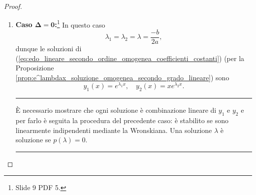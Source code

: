 \begin{proof}
\begin{enumerate}
		\item \textbf{Caso $\boldsymbol{\Delta=0}$:}\footnote{Slide 9 PDF 5.} In questo caso
		\begin{equation*}
			\lambda_1=\lambda_2=\lambda=\frac{-b}{2a},
		\end{equation*}
		dunque le soluzioni di (\ref{eq:edo_lineare_secondo_ordine_omogenea_coefficienti_costanti}) (per la Proposizione \ref{prop:e^lambdax_soluzione_omogenea_secondo_grado_lineare}) sono
		\begin{equation*}
			y_1(x)=e^{\lambda_1 x},\quad y_2(x) = xe^{\lambda_2 x}.
		\end{equation*}
		\hrule\vspace{-2px}
		È necessario mostrare che ogni soluzione è combinazione lineare di $y_1$ e $y_2$ e per farlo è seguita la procedura del precedente caso: è stabilito se sono linearmente indipendenti mediante la Wronskiana. Una soluzione $\lambda$ è soluzione se $p(\lambda)=0$.
		\hrule\vspace{2px}
		

\end{enumerate}
\end{proof}
